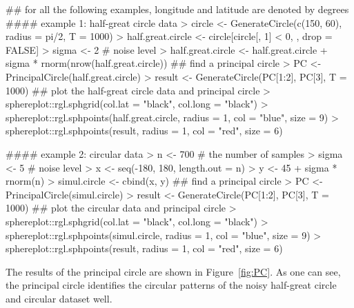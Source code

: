 \begin{example}
   ## for all the following examples, longitude and latitude are denoted by degrees
   #### example 1: half-great circle data
   > circle <- GenerateCircle(c(150, 60), radius = pi/2, T = 1000)
   > half.great.circle <- circle[circle[, 1] < 0, , drop = FALSE]
   > sigma <- 2                           # noise level
   > half.great.circle <- half.great.circle + sigma * rnorm(nrow(half.great.circle))
   ## find a principal circle
   > PC <- PrincipalCircle(half.great.circle)
   > result <- GenerateCircle(PC[1:2], PC[3], T = 1000)
   ## plot the half-great circle data and principal circle
   > sphereplot::rgl.sphgrid(col.lat = "black", col.long = "black")
   > sphereplot::rgl.sphpoints(half.great.circle, radius = 1, col = "blue", size = 9)
   > sphereplot::rgl.sphpoints(result, radius = 1, col = "red", size = 6)

   #### example 2: circular data
   > n <- 700                             # the number of samples
   > sigma <- 5                           # noise level 
   > x <- seq(-180, 180, length.out = n)
   > y <- 45 + sigma * rnorm(n)
   > simul.circle <- cbind(x, y)
   ## find a principal circle
   > PC <- PrincipalCircle(simul.circle)
   > result <- GenerateCircle(PC[1:2], PC[3], T = 1000)
   ## plot the circular data and principal circle
   > sphereplot::rgl.sphgrid(col.lat = "black", col.long = "black")
   > sphereplot::rgl.sphpoints(simul.circle, radius = 1, col = "blue", size = 9)
   > sphereplot::rgl.sphpoints(result, radius = 1, col = "red", size = 6)
\end{example}
The results of the principal circle are shown in Figure~\ref{fig:PC}. As one can see, the principal circle identifies the circular patterns of the noisy half-great circle and circular dataset well.

